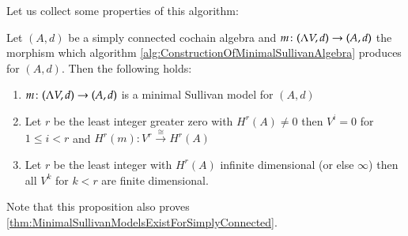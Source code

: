 Let us collect some properties of this algorithm:
\begin{Proposition}
\label{prop:PropertiesOfAlgorithm}
 Let $(A,d)$ be a simply connected cochain algebra and $m \colon (\Lambda V,d) \to (A,d)$ the morphism which
 algorithm \ref{alg:ConstructionOfMinimalSullivanAlgebra} produces for $(A,d)$. Then the following  holds:
 \begin{enumerate}
  \item $m \colon (\Lambda V,d) \to (A,d)$ is a minimal Sullivan model for $(A,d)$
  \item Let $r$ be the least integer greater zero with $H^r(A) \neq 0$ then $V^i = 0$ for $1 \leq i < r$ and
    $H^r(m) \colon V^r \overset{\cong}{\to} H^r(A)$
  \item Let $r$ be the least integer with $H^r(A)$ infinite dimensional (or else $\infty$) then
    all $V^k$ for $k < r$ are finite dimensional.
 \end{enumerate}

\end{Proposition}
Note that this proposition also proves \ref{thm:MinimalSullivanModelsExistForSimplyConnected}.
